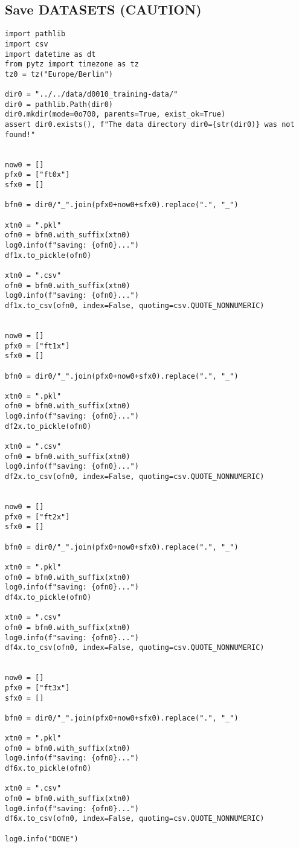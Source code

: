\documentclass[a4paper,10pt,onecolumn,oneside,openright]{article}
\begin{document}
\subsection{Save DATASETS (CAUTION)}
\label{sec:org374147c}
\begin{verbatim}
import pathlib
import csv
import datetime as dt
from pytz import timezone as tz
tz0 = tz("Europe/Berlin")

dir0 = "../../data/d0010_training-data/"
dir0 = pathlib.Path(dir0)
dir0.mkdir(mode=0o700, parents=True, exist_ok=True)
assert dir0.exists(), f"The data directory dir0={str(dir0)} was not found!"


now0 = []
pfx0 = ["ft0x"]
sfx0 = []

bfn0 = dir0/"_".join(pfx0+now0+sfx0).replace(".", "_")

xtn0 = ".pkl"
ofn0 = bfn0.with_suffix(xtn0)
log0.info(f"saving: {ofn0}...")
df1x.to_pickle(ofn0)

xtn0 = ".csv"
ofn0 = bfn0.with_suffix(xtn0)
log0.info(f"saving: {ofn0}...")
df1x.to_csv(ofn0, index=False, quoting=csv.QUOTE_NONNUMERIC)


now0 = []
pfx0 = ["ft1x"]
sfx0 = []

bfn0 = dir0/"_".join(pfx0+now0+sfx0).replace(".", "_")

xtn0 = ".pkl"
ofn0 = bfn0.with_suffix(xtn0)
log0.info(f"saving: {ofn0}...")
df2x.to_pickle(ofn0)

xtn0 = ".csv"
ofn0 = bfn0.with_suffix(xtn0)
log0.info(f"saving: {ofn0}...")
df2x.to_csv(ofn0, index=False, quoting=csv.QUOTE_NONNUMERIC)


now0 = []
pfx0 = ["ft2x"]
sfx0 = []

bfn0 = dir0/"_".join(pfx0+now0+sfx0).replace(".", "_")

xtn0 = ".pkl"
ofn0 = bfn0.with_suffix(xtn0)
log0.info(f"saving: {ofn0}...")
df4x.to_pickle(ofn0)

xtn0 = ".csv"
ofn0 = bfn0.with_suffix(xtn0)
log0.info(f"saving: {ofn0}...")
df4x.to_csv(ofn0, index=False, quoting=csv.QUOTE_NONNUMERIC)


now0 = []
pfx0 = ["ft3x"]
sfx0 = []

bfn0 = dir0/"_".join(pfx0+now0+sfx0).replace(".", "_")

xtn0 = ".pkl"
ofn0 = bfn0.with_suffix(xtn0)
log0.info(f"saving: {ofn0}...")
df6x.to_pickle(ofn0)

xtn0 = ".csv"
ofn0 = bfn0.with_suffix(xtn0)
log0.info(f"saving: {ofn0}...")
df6x.to_csv(ofn0, index=False, quoting=csv.QUOTE_NONNUMERIC)

log0.info("DONE")
\end{verbatim}
\end{document}
